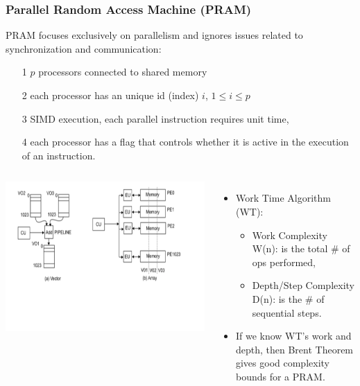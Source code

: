 \documentclass{beamer}
\newcommand{\emp}[1]{\textcolor{DikuRed}{ #1}}
\begin{document}
\begin{frame}[fragile,t]
  \frametitle{Parallel Random Access Machine (PRAM)}

PRAM focuses exclusively on parallelism and ignores issues
related to synchronization and communication:
\begin{itemize}
    \item[1] $p$ processors connected to shared memory
    \item[2] each processor has an unique id (index) $i$, $1 \leq i \leq p$
    \item[3] SIMD execution, each parallel instruction requires unit time,
    \item[4] each processor has a flag that controls whether it is active
                in the execution of an instruction.
\end  {itemize}

\pause

\begin{columns}
\includegraphics[height=33ex]{Figures/L2/VectorMachine}
\vspace{-15ex}
\begin{itemize}
    \item \emp{Work Time Algorithm (WT):}
    \begin{itemize}
        \item \emp{Work Complexity W(n)}:       is the total \# of ops performed,
        \item \emp{Depth/Step Complexity D(n)}: is the \# of sequential steps.
    \end{itemize}
    \item If we know WT's work and depth, then Brent Theorem 
            gives good complexity bounds for a PRAM.
\end{itemize}
\end{columns}

\end{frame}
\end{document}
